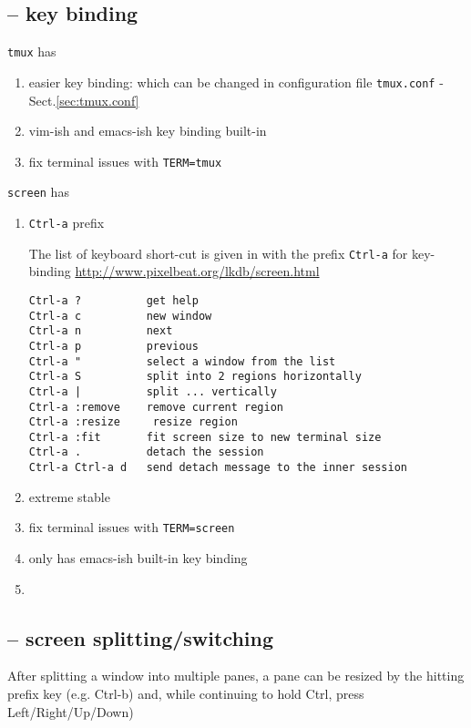 \subsection{-- key binding}
\label{sec:tmux-prefix}

\verb!tmux! has
\begin{enumerate}
  \item easier key binding: which can be changed in configuration file
  \verb!tmux.conf! - Sect.\ref{sec:tmux.conf}
  
  
  \item vim-ish and emacs-ish key binding built-in
  
  \item fix terminal issues with \verb!TERM=tmux! 
\end{enumerate}


\verb!screen! has
\begin{enumerate}
  \item \verb!Ctrl-a! prefix

The list of keyboard short-cut is given in 
with the prefix \verb!Ctrl-a! for
key-binding \url{http://www.pixelbeat.org/lkdb/screen.html}

{\tiny
\begin{verbatim}
Ctrl-a ?          get help
Ctrl-a c          new window
Ctrl-a n          next
Ctrl-a p          previous
Ctrl-a "          select a window from the list
Ctrl-a S          split into 2 regions horizontally
Ctrl-a |          split ... vertically
Ctrl-a :remove    remove current region
Ctrl-a :resize     resize region
Ctrl-a :fit       fit screen size to new terminal size
Ctrl-a .          detach the session
Ctrl-a Ctrl-a d   send detach message to the inner session
\end{verbatim}
}


  \item extreme stable
  \item fix terminal issues with \verb!TERM=screen!
  \item only has emacs-ish built-in key binding
  \item 
\end{enumerate}

\subsection{-- screen splitting/switching}


After splitting a window into multiple panes, a pane can be resized by the
hitting prefix key (e.g. Ctrl-b) and, while continuing to hold Ctrl, press
Left/Right/Up/Down)

